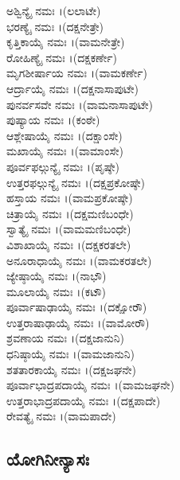 ಅಶ್ವಿನ್ಯೈ ನಮಃ ।(ಲಲಾಟೇ)\\
 ಭರಣ್ಯೈ ನಮಃ ।(ದಕ್ಷನೇತ್ರೇ)\\
 ಕೃತ್ತಿಕಾಯೈ ನಮಃ ।(ವಾಮನೇತ್ರೇ)\\
ರೋಹಿಣ್ಯೈ ನಮಃ ।(ದಕ್ಷಕರ್ಣೇ)\\
ಮೃಗಶೀರ್ಷಾಯ ನಮಃ ।(ವಾಮಕರ್ಣೇ)\\
ಆರ್ದ್ರಾಯೈ ನಮಃ ।(ದಕ್ಷನಾಸಾಪುಟೇ)\\
 ಪುನರ್ವಸವೇ ನಮಃ ।(ವಾಮನಾಸಾಪುಟೇ)\\
ಪುಷ್ಯಾಯ ನಮಃ ।(ಕಂಠೇ)\\
 ಆಶ್ಲೇಷಾಯೈ ನಮಃ ।(ದಕ್ಷಾಂಸೇ)\\
 ಮಖಾಯೈ ನಮಃ ।(ವಾಮಾಂಸೇ)\\
ಪೂರ್ವಫಲ್ಗುನ್ಯೈ ನಮಃ ।(ಪೃಷ್ಠೇ)\\
 ಉತ್ತರಫಲ್ಗುನ್ಯೈ ನಮಃ ।(ದಕ್ಷಪ್ರಕೋಷ್ಠೇ)\\
 ಹಸ್ತಾಯ ನಮಃ ।(ವಾಮಪ್ರಕೋಷ್ಠೇ)\\
ಚಿತ್ರಾಯೈ ನಮಃ ।(ದಕ್ಷಮಣಿಬಂಧೇ)\\
ಸ್ವಾತ್ಯೈ ನಮಃ ।(ವಾಮಮಣಿಬಂಧೇ)\\
 ವಿಶಾಖಾಯೈ ನಮಃ ।(ದಕ್ಷಕರತಲೇ)\\
 ಅನೂರಾಧಾಯೈ ನಮಃ ।(ವಾಮಕರತಲೇ)\\
ಜ್ಯೇಷ್ಠಾಯೈ ನಮಃ ।(ನಾಭೌ)\\
 ಮೂಲಾಯೈ ನಮಃ ।(ಕಟೌ)\\
 ಪೂರ್ವಾಷಾಢಾಯೈ ನಮಃ ।(ದಕ್ಷೋರೌ)\\
ಉತ್ತರಾಷಾಢಾಯೈ ನಮಃ ।(ವಾಮೋರೌ)\\
ಶ್ರವಣಾಯ ನಮಃ ।(ದಕ್ಷಜಾನುನಿ)\\
 ಧನಿಷ್ಠಾಯೈ ನಮಃ ।(ವಾಮಜಾನುನಿ)\\
 ಶತತಾರಕಾಯೈ ನಮಃ ।(ದಕ್ಷಜಘನೇ)\\
 ಪೂರ್ವಾಭಾದ್ರಪದಾಯೈ ನಮಃ ।(ವಾಮಜಘನೇ)\\
  ಉತ್ತರಾಭಾದ್ರಪದಾಯೈ ನಮಃ ।(ದಕ್ಷಪಾದೇ)\\
ರೇವತ್ಯೈ ನಮಃ ।(ವಾಮಪಾದೇ)
\newpage
\subsection{ಯೋಗಿನೀನ್ಯಾಸಃ}

